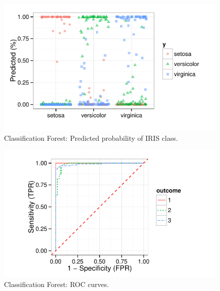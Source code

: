 \documentclass[nojss]{jss}\usepackage[]{graphicx}\usepackage[]{color}
\makeatletter
\def\maxwidth{ %
  \ifdim\Gin@nat@width>\linewidth
    \linewidth
  \else
    \Gin@nat@width
  \fi
}
\newenvironment{knitrout}{}{} %
\makeatother
\begin{document}
\begin{knitrout}\footnotesize
{}\color{fgcolor}\begin{figure}[!htpb]


{\centering \includegraphics[width=\maxwidth]{figure/vig-iris-rf-pred-1} 

}

\caption[Classification Forest]{Classification Forest: Predicted probability of IRIS class.\label{fig:iris-rf-pred}}
\end{figure}


\end{knitrout}


\begin{knitrout}\footnotesize
{}\color{fgcolor}\begin{figure}[!htpb]


{\centering \includegraphics[width=\maxwidth]{figure/vig-iris-rf-roc-1} 

}

\caption[Classification Forest]{Classification Forest: ROC curves.\label{fig:iris-rf-roc}}
\end{figure}


\end{knitrout}
\end{document}
